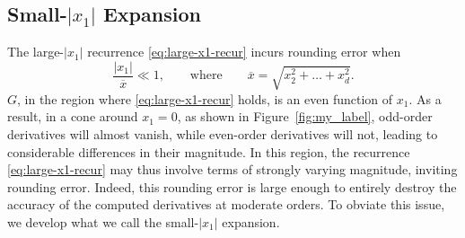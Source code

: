 \documentclass[12pt]{article}
\theoremstyle{definition}
\theoremstyle{plain}
\theoremstyle{definition}
\begin{document}
\subsection{Small-$|x_1|$ Expansion}
\label{sec:small-x1}
The large-$|x_1|$ recurrence \eqref{eq:large-x1-recur} incurs rounding error when
\begin{equation}
\label{eq:cone-small-x1}
\frac{|x_1|}{\overline{x}} \ll 1,
\qquad\text{where}\qquad
\overline{x} = \sqrt{x_2^2 + \dots + x_d^2}.
\end{equation}
$G$, in the region where \eqref{eq:large-x1-recur} holds, is an even function of $x_1$. As a result, in a cone around $x_1=0$, as shown in Figure~\ref{fig:my_label}, odd-order derivatives will almost vanish, while even-order derivatives will not, leading to considerable differences in their magnitude.
In this region, the recurrence \eqref{eq:large-x1-recur} may thus involve terms of strongly varying magnitude, inviting rounding error. Indeed, this rounding error is large enough to entirely destroy the accuracy of the computed derivatives at moderate orders. To obviate this issue, we develop what we call the small-$|x_1|$ expansion.
\end{document}
